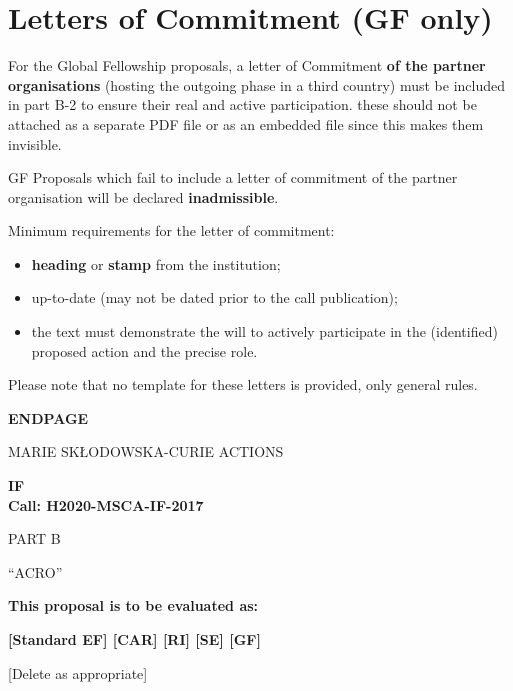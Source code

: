 \newpage
\section{Letters of Commitment (GF only)}
\label{sec:letters}

For the Global Fellowship proposals, a letter of Commitment\textbf{ of the partner organisations} (hosting the outgoing phase in a third country) must be included in part B-2 to ensure their real and active participation. these should not be attached as a separate PDF file or as an embedded file since this makes them invisible.

GF Proposals which fail to include a letter of commitment of the partner organisation will be declared \textbf{inadmissible}.

Minimum requirements for the letter of commitment: 

\begin{itemize}
	\item \textbf{heading} or \textbf{stamp} from the institution; 
	\item up-to-date (may not be dated prior to the call publication);
	\item the text must demonstrate the will to actively participate in the (identified) proposed action and the precise role.
\end{itemize}

\medskip\noindent
Please note that no template for these letters is provided, only general rules.





\newpage
\label{sec:endpage}
\vspace{15mm}
\begin{center}
	
	
	\Large{
		
		
		\textbf{ENDPAGE}
		
		\vspace{15mm}
		MARIE SK\L{}ODOWSKA-CURIE ACTIONS\\
		\vspace{1cm}
		
		\textbf{\acf{IF}}\\
		\textbf{Call: H2020-MSCA-IF-2017}
		\vspace{2cm}                   
		
		PART B
		\vspace{2.5cm}
		
		``{\sc \ac{ACRO}\xspace}''
		\vspace{2cm}
		
		\textbf{This proposal is to be evaluated as:}
		\vspace{.5cm}
		
		\textbf{[Standard EF] [CAR] [RI] [SE] [GF]}\\
	}
	\large{[Delete as appropriate]}
	
\end{center}
\vspace{1cm}
